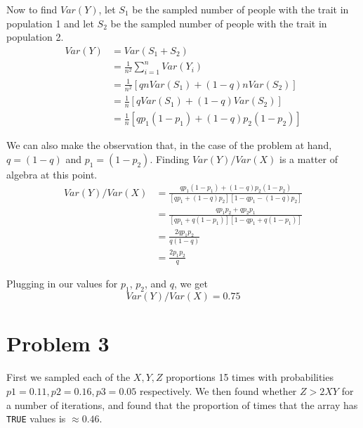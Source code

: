 \documentclass{article}
\begin{document}
Now to find $Var(Y)$, let $S_1$ be the sampled number of people with the trait
in population 1 and let $S_2$ be the sampled number of people with the trait in
population 2.
\begin{align*}
  Var(Y) &= Var(S_1 + S_2) \\
         &= \frac{1}{n^2}\sum\limits_{i = 1}^{n} Var( Y_i ) \\
         &= \frac{1}{n^2}\left[qnVar( S_1 ) + (1-q)nVar( S_2 ) \right] \\
         &= \frac{1}{n} [qVar( S_1 ) + (1-q)Var(S_2)] \\
         &= \frac{1}{n} [qp_1(1-p_1) + (1-q)p_2(1-p_2)]
\end{align*}

We can also make the observation that, in the case of the problem at hand, $q =
(1-q)$ and $p_1 = (1 - p_2)$. Finding $Var(Y)/Var(X)$ is a matter of algebra at
this point.
\begin{align*}
  Var(Y)/Var(X) &= \frac{qp_1(1-p_1)+(1-q)p_2(1-p_2)}{[qp_1+(1-q)p_2]
[1-qp_1-(1-q)p_2]} \\
&= \frac{qp_1p_2 + qp_2p_1}{[qp_1+q(1-p_1)][1-qp_1+q(1-p_1)]} \\
&= \frac{2qp_1p_2}{q(1-q)} \\
&= \frac{2p_1p_2}{q}
\end{align*}

Plugging in our values for $p_1$, $p_2$, and $q$, we get
\begin{equation*}
  Var(Y)/Var(X) = 0.75
\end{equation*}

\section*{Problem 3}
First we sampled each of the $X,Y,Z$ proportions 15 times with probabilities $p1=0.11, p2=0.16, p3=0.05$ respectively. We then found whether $Z > 2XY$ for a number of iterations, and found that the proportion of times that the array has \verb+TRUE+ values is $\approx 0.46$.
\end{document}
